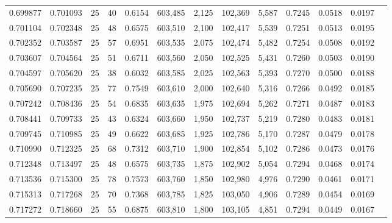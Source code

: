 \begin{tabular}{rrrrrrrrrrrrr}
0.699877 & 0.701093 &    25 &  40 &                                     0.6154 & 603,485 &   2,125 & 102,369 &   5,587 & 0.7245 & 0.0518 & 0.0197 \\
0.701104 & 0.702348 &    25 &  48 &                                     0.6575 & 603,510 &   2,100 & 102,417 &   5,539 & 0.7251 & 0.0513 & 0.0195 \\
0.702352 & 0.703587 &    25 &  57 &                                     0.6951 & 603,535 &   2,075 & 102,474 &   5,482 & 0.7254 & 0.0508 & 0.0192 \\
0.703607 & 0.704564 &    25 &  51 &                                     0.6711 & 603,560 &   2,050 & 102,525 &   5,431 & 0.7260 & 0.0503 & 0.0190 \\
0.704597 & 0.705620 &    25 &  38 &                                     0.6032 & 603,585 &   2,025 & 102,563 &   5,393 & 0.7270 & 0.0500 & 0.0188 \\
0.705690 & 0.707235 &    25 &  77 &                                     0.7549 & 603,610 &   2,000 & 102,640 &   5,316 & 0.7266 & 0.0492 & 0.0185 \\
0.707242 & 0.708436 &    25 &  54 &                                     0.6835 & 603,635 &   1,975 & 102,694 &   5,262 & 0.7271 & 0.0487 & 0.0183 \\
0.708441 & 0.709733 &    25 &  43 &                                     0.6324 & 603,660 &   1,950 & 102,737 &   5,219 & 0.7280 & 0.0483 & 0.0181 \\
0.709745 & 0.710985 &    25 &  49 &                                     0.6622 & 603,685 &   1,925 & 102,786 &   5,170 & 0.7287 & 0.0479 & 0.0178 \\
0.710990 & 0.712325 &    25 &  68 &                                     0.7312 & 603,710 &   1,900 & 102,854 &   5,102 & 0.7286 & 0.0473 & 0.0176 \\
0.712348 & 0.713497 &    25 &  48 &                                     0.6575 & 603,735 &   1,875 & 102,902 &   5,054 & 0.7294 & 0.0468 & 0.0174 \\
0.713536 & 0.715300 &    25 &  78 &                                     0.7573 & 603,760 &   1,850 & 102,980 &   4,976 & 0.7290 & 0.0461 & 0.0171 \\
0.715313 & 0.717268 &    25 &  70 &                                     0.7368 & 603,785 &   1,825 & 103,050 &   4,906 & 0.7289 & 0.0454 & 0.0169 \\
0.717272 & 0.718660 &    25 &  55 &                                     0.6875 & 603,810 &   1,800 & 103,105 &   4,851 & 0.7294 & 0.0449 & 0.0167 \\

\end{tabular}
